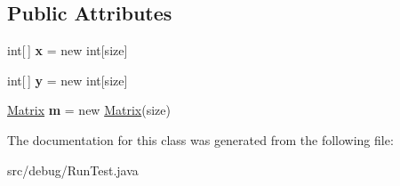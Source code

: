 \subsection*{Public Attributes}
\begin{DoxyCompactItemize}
\item 
int\mbox{[}$\,$\mbox{]} {\bfseries x} = new int\mbox{[}size\mbox{]}\hypertarget{classdebug_1_1_run_test_a5f4f5a3491dcff209d74e7e09455ea19}{}\label{classdebug_1_1_run_test_a5f4f5a3491dcff209d74e7e09455ea19}

\item 
int\mbox{[}$\,$\mbox{]} {\bfseries y} = new int\mbox{[}size\mbox{]}\hypertarget{classdebug_1_1_run_test_af4184879c8314ca747eebe07266ff92d}{}\label{classdebug_1_1_run_test_af4184879c8314ca747eebe07266ff92d}

\item 
\hyperlink{classheneticmethod_1_1_matrix}{Matrix} {\bfseries m} = new \hyperlink{classheneticmethod_1_1_matrix}{Matrix}(size)\hypertarget{classdebug_1_1_run_test_a5a4dc38e22121866f487920fb8fb2a25}{}\label{classdebug_1_1_run_test_a5a4dc38e22121866f487920fb8fb2a25}

\end{DoxyCompactItemize}


The documentation for this class was generated from the following file\+:\begin{DoxyCompactItemize}
\item 
src/debug/Run\+Test.\+java\end{DoxyCompactItemize}
